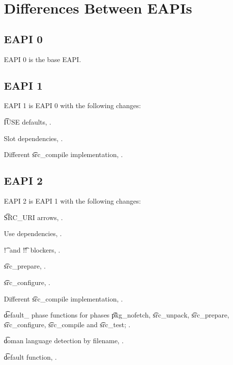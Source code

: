 \chapter{Differences Between EAPIs}


\section{EAPI 0}

EAPI 0 is the base EAPI.

\section{EAPI 1}

EAPI 1 is EAPI 0 with the following changes:

\begin{compactitem}
\item \t{IUSE} defaults, .
\item Slot dependencies, .
\item Different \t{src_compile} implementation, .
\end{compactitem}

\section{EAPI 2}

EAPI 2 is EAPI 1 with the following changes:

\begin{compactitem}
\item \t{SRC_URI} arrows, .
\item Use dependencies, .
\item \t{!}\ and \t{!!}\ blockers, .
\item \t{src_prepare}, .
\item \t{src_configure}, .
\item Different \t{src_compile} implementation, .
\item \t{default_} phase functions for phases \t{pkg_nofetch}, \t{src_unpack}, \t{src_prepare},
    \t{src_configure}, \t{src_compile} and \t{src_test}; .
\item \t{doman} language detection by filename, .
\item \t{default} function, .
\end{compactitem}

